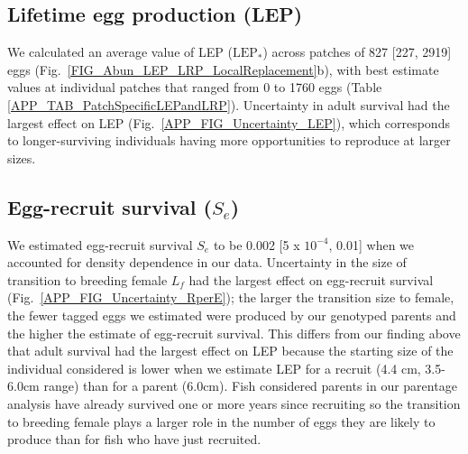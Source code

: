 \documentclass[12pt, oneside]{article}   	%
\begin{document}
\subsection{Lifetime egg production (LEP)} \label{APP_SEC_RESULTS_LEP}  %
We calculated an average value of LEP ($\text{LEP}_*$) across patches of 827 [227, 2919] eggs (Fig.\ \ref{FIG_Abun_LEP_LRP_LocalReplacement}b), with best estimate values at individual patches that ranged from 0 to 1760 eggs (Table \ref{APP_TAB_PatchSpecificLEPandLRP}). Uncertainty in adult survival had the largest effect on LEP (Fig.\ \ref{APP_FIG_Uncertainty_LEP}), which corresponds to longer-surviving individuals having more opportunities to reproduce at larger sizes. 

\subsection{Egg-recruit survival ($S_e$)} \label{APP_SEC_RESULTS_Egg-recruit_survival}  %

We estimated egg-recruit survival $S_{e}$ to be 0.002 [5 x $10^{-4}$, 0.01] when we accounted for density dependence in our data. Uncertainty in the size of transition to breeding female $L_f$ had the largest effect on egg-recruit survival (Fig.\ \ref{APP_FIG_Uncertainty_RperE}); the larger the transition size to female, the fewer tagged eggs we estimated were produced by our genotyped parents and the higher the estimate of egg-recruit survival. This differs from our finding above that adult survival had the largest effect on LEP because the starting size of the individual considered is lower when we estimate LEP for a recruit (4.4 cm, 3.5-6.0cm range) than for a parent (6.0cm). Fish considered parents in our parentage analysis have already survived one or more years since recruiting so the transition to breeding female plays a larger role in the number of eggs they are likely to produce than for fish who have just recruited. 

\end{document}
